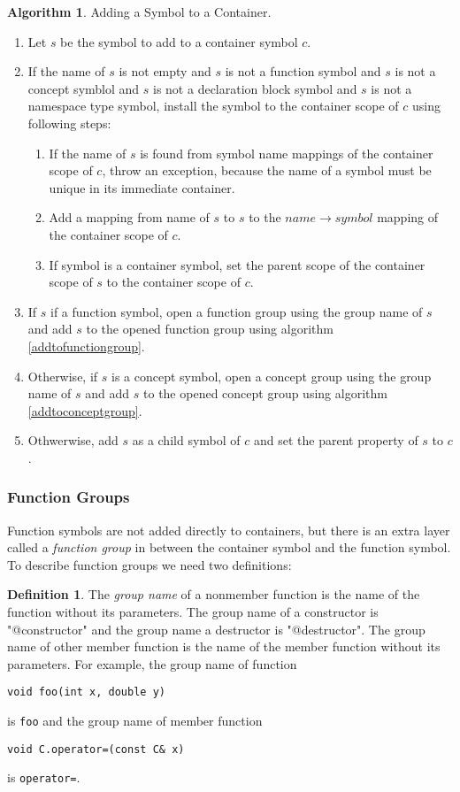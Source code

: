 \documentclass[a4paper,oneside,11pt]{book}
\theoremstyle{definition}
\newtheorem{algo}{Algorithm}[section]
\newtheorem{defn}{Definition}[section]
\begin{document}
\begin{algo}\label{addsymboltocontainer} Adding a Symbol to a Container.
\begin{enumerate}
\item
Let $s$ be the symbol to add to a container symbol $c$.
\item
If the name of $s$ is not empty and $s$ is not a function symbol and $s$ is not a concept symblol and $s$ is not a declaration block symbol and
$s$ is not a namespace type symbol, install the symbol to the container scope of $c$ using following steps:
\begin{enumerate}
\item
If the name of $s$ is found from symbol name mappings of the container scope of $c$, throw an exception,
because the name of a symbol must be unique in its immediate container.
\item
Add a mapping from name of $s$ to $s$ to the $name \rightarrow symbol$ mapping of the container scope of $c$.
\item
If symbol is a container symbol, set the parent scope of the container scope of $s$ to the container scope of $c$.
\end{enumerate}
\item
If $s$ if a function symbol, open a function group using the group name of $s$ and add $s$ to the opened function group using algorithm
\ref{addtofunctiongroup}.
\item
Otherwise, if $s$ is a concept symbol, open a concept group using the group name of $s$ and add $s$ to the opened concept group using algorithm
\ref{addtoconceptgroup}.
\item
Othwerwise, add $s$ as a child symbol of $c$ and set the parent property of $s$ to $c$.
\end{enumerate}
\end{algo}

\subsubsection{Function Groups}

Function symbols are not added directly to containers, but there is an extra layer called a \emph{function group}
in between the container symbol and the function symbol. To describe function groups we need two definitions:

\begin{defn}\label{groupname} The \emph{group name} of a nonmember function is the name of the function without its parameters.
The group name of a constructor is "@constructor" and the group name a destructor is "@destructor".
The group name of other member function is the name of the member function without its parameters.
For example, the group name of function
\begin{verbatim}
void foo(int x, double y)
\end{verbatim}
is \verb|foo| and the group name of member function
\begin{verbatim}
void C.operator=(const C& x)
\end{verbatim}
is \verb|operator=|.
\end{defn}
\end{document}
